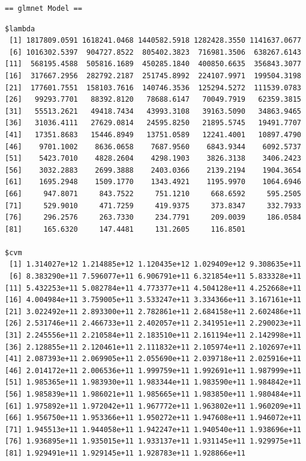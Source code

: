 \documentclass[
]{article}
\begin{document}
\begin{verbatim}
== glmnet Model ==
\end{verbatim}

\begin{verbatim}
$lambda
 [1] 1817809.0591 1618241.0468 1440582.5918 1282428.3550 1141637.0677
 [6] 1016302.5397  904727.8522  805402.3823  716981.3506  638267.6143
[11]  568195.4588  505816.1689  450285.1840  400850.6635  356843.3077
[16]  317667.2956  282792.2187  251745.8992  224107.9971  199504.3198
[21]  177601.7551  158103.7616  140746.3536  125294.5272  111539.0783
[26]   99293.7701   88392.8120   78688.6147   70049.7919   62359.3815
[31]   55513.2621   49418.7434   43993.3108   39163.5090   34863.9465
[36]   31036.4111   27629.0814   24595.8250   21895.5745   19491.7707
[41]   17351.8683   15446.8949   13751.0589   12241.4001   10897.4790
[46]    9701.1002    8636.0658    7687.9560    6843.9344    6092.5737
[51]    5423.7010    4828.2604    4298.1903    3826.3138    3406.2423
[56]    3032.2883    2699.3888    2403.0366    2139.2194    1904.3654
[61]    1695.2948    1509.1770    1343.4921    1195.9970    1064.6946
[66]     947.8071     843.7522     751.1210     668.6592     595.2505
[71]     529.9010     471.7259     419.9375     373.8347     332.7933
[76]     296.2576     263.7330     234.7791     209.0039     186.0584
[81]     165.6320     147.4481     131.2605     116.8501

$cvm
 [1] 1.314027e+12 1.214885e+12 1.120435e+12 1.029409e+12 9.308635e+11
 [6] 8.383290e+11 7.596077e+11 6.906791e+11 6.321854e+11 5.833328e+11
[11] 5.432253e+11 5.082784e+11 4.773377e+11 4.504128e+11 4.252668e+11
[16] 4.004984e+11 3.759005e+11 3.533247e+11 3.334366e+11 3.167161e+11
[21] 3.022492e+11 2.893300e+11 2.782861e+11 2.684158e+11 2.602486e+11
[26] 2.531746e+11 2.466733e+11 2.402057e+11 2.341951e+11 2.290023e+11
[31] 2.245556e+11 2.210584e+11 2.183510e+11 2.161194e+11 2.142998e+11
[36] 2.128855e+11 2.120461e+11 2.111832e+11 2.105974e+11 2.102697e+11
[41] 2.087393e+11 2.069905e+11 2.055690e+11 2.039718e+11 2.025916e+11
[46] 2.014172e+11 2.006536e+11 1.999759e+11 1.992691e+11 1.987999e+11
[51] 1.985365e+11 1.983930e+11 1.983344e+11 1.983590e+11 1.984842e+11
[56] 1.985839e+11 1.986021e+11 1.985665e+11 1.983850e+11 1.980484e+11
[61] 1.975892e+11 1.972042e+11 1.967772e+11 1.963802e+11 1.960209e+11
[66] 1.956750e+11 1.953366e+11 1.950272e+11 1.947608e+11 1.946072e+11
[71] 1.945513e+11 1.944058e+11 1.942247e+11 1.940540e+11 1.938696e+11
[76] 1.936895e+11 1.935015e+11 1.933137e+11 1.931145e+11 1.929975e+11
[81] 1.929491e+11 1.929145e+11 1.928783e+11 1.928866e+11


\end{verbatim}
\end{document}
